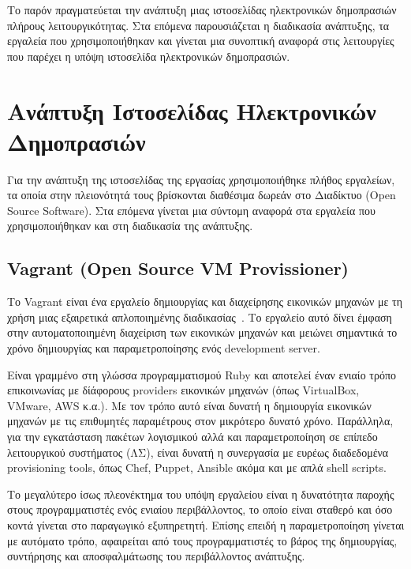 \documentclass[12pt]{report}
\begin{document}
Το παρόν πραγματεύεται την ανάπτυξη μιας ιστοσελίδας ηλεκτρονικών δημοπρασιών πλήρους λειτουργικότητας. Στα επόμενα παρουσιάζεται η διαδικασία ανάπτυξης, τα εργαλεία που χρησιμοποιήθηκαν και γίνεται μια συνοπτική αναφορά στις λειτουργίες που παρέχει η υπόψη ιστοσελίδα ηλεκτρονικών δημοπρασιών.

\chapter{Ανάπτυξη Ιστοσελίδας Ηλεκτρονικών Δημοπρασιών}\label{ch2}
Για την ανάπτυξη της ιστοσελίδας της εργασίας χρησιμοποιήθηκε πλήθος εργαλείων, τα οποία στην πλειονότητά τους βρίσκονται διαθέσιμα δωρεάν στο Διαδίκτυο (\textlatin{Open Source Software}). Στα επόμενα γίνεται μια σύντομη αναφορά στα εργαλεία που χρησιμοποιήθηκαν και στη διαδικασία της ανάπτυξης.

\section{\textlatin{\textlatin{Vagrant (Open Source VM Provissioner)}}}\label{vagrant}
Το \textlatin{Vagrant} είναι ένα εργαλείο δημιουργίας και διαχείρησης εικονικών μηχανών με τη χρήση μιας εξαιρετικά απλοποιημένης διαδικασίας~\cite{vagrant_by_hashicorp}. Το εργαλείο αυτό δίνει έμφαση στην αυτοματοποιημένη διαχείριση των εικονικών μηχανών και μειώνει σημαντικά το χρόνο δημιουργίας και παραμετροποίησης ενός \textlatin{development server}.

Είναι γραμμένο στη γλώσσα προγραμματισμού \textlatin{Ruby} και αποτελεί έναν ενιαίο τρόπο επικοινωνίας με δίάφορους \textlatin{providers} εικονικών μηχανών (όπως \textlatin{VirtualBox, VMware, AWS} κ.α.). Με τον τρόπο αυτό είναι δυνατή η δημιουργία εικονικών μηχανών με τις επιθυμητές παραμέτρους στον μικρότερο δυνατό χρόνο. Παράλληλα, για την εγκατάσταση πακέτων λογισμικού αλλά και παραμετροποίηση σε επίπεδο λειτουργικού συστήματος (ΛΣ), είναι δυνατή η συνεργασία με ευρέως διαδεδομένα \textlatin{provisioning tools}, όπως \textlatin{Chef, Puppet, Ansible} ακόμα και με απλά \textlatin{shell scripts}.

Το μεγαλύτερο ίσως πλεονέκτημα του υπόψη εργαλείου είναι η δυνατότητα παροχής στους προγραμματιστές ενός ενιαίου περιβάλλοντος, το οποίο είναι σταθερό και όσο κοντά γίνεται στο παραγωγικό εξυπηρετητή. Επίσης επειδή η παραμετροποίηση γίνεται με αυτόματο τρόπο, αφαιρείται από τους προγραμματιστές το βάρος της δημιουργίας, συντήρησης και αποσφαλμάτωσης του περιβάλλοντος ανάπτυξης.
\end{document}
